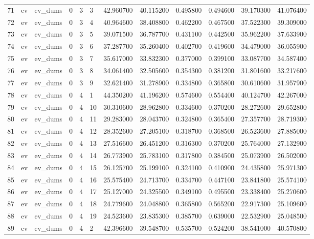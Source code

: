 \begin{tabular}{llllllrrrrrr}
71 & ev & ev_dums & 0 & 3 & 3 & 42.960700 & 40.115200 & 0.495800 & 0.494600 & 39.170300 & 41.076400 \\
72 & ev & ev_dums & 0 & 3 & 4 & 40.964600 & 38.408800 & 0.462200 & 0.467500 & 37.522300 & 39.309000 \\
73 & ev & ev_dums & 0 & 3 & 5 & 39.071500 & 36.787700 & 0.431100 & 0.442500 & 35.962200 & 37.633900 \\
74 & ev & ev_dums & 0 & 3 & 6 & 37.287700 & 35.260400 & 0.402700 & 0.419600 & 34.479000 & 36.055900 \\
75 & ev & ev_dums & 0 & 3 & 7 & 35.617000 & 33.832300 & 0.377000 & 0.399100 & 33.087700 & 34.587400 \\
76 & ev & ev_dums & 0 & 3 & 8 & 34.061400 & 32.505600 & 0.354300 & 0.381200 & 31.801600 & 33.217600 \\
77 & ev & ev_dums & 0 & 3 & 9 & 32.621400 & 31.278900 & 0.334800 & 0.365800 & 30.610600 & 31.957900 \\
78 & ev & ev_dums & 0 & 4 & 1 & 44.350200 & 41.196200 & 0.574600 & 0.554400 & 40.124700 & 42.267000 \\
79 & ev & ev_dums & 0 & 4 & 10 & 30.310600 & 28.962800 & 0.334600 & 0.370200 & 28.272600 & 29.652800 \\
80 & ev & ev_dums & 0 & 4 & 11 & 29.283000 & 28.043700 & 0.324800 & 0.365400 & 27.357700 & 28.719300 \\
81 & ev & ev_dums & 0 & 4 & 12 & 28.352600 & 27.205100 & 0.318700 & 0.368500 & 26.523600 & 27.885000 \\
82 & ev & ev_dums & 0 & 4 & 13 & 27.516600 & 26.451200 & 0.316300 & 0.370200 & 25.764000 & 27.132900 \\
83 & ev & ev_dums & 0 & 4 & 14 & 26.773900 & 25.783100 & 0.317800 & 0.384500 & 25.073900 & 26.502000 \\
84 & ev & ev_dums & 0 & 4 & 15 & 26.125700 & 25.199100 & 0.324100 & 0.410900 & 24.435800 & 25.971300 \\
85 & ev & ev_dums & 0 & 4 & 16 & 25.575400 & 24.713700 & 0.334700 & 0.447100 & 23.841800 & 25.574100 \\
86 & ev & ev_dums & 0 & 4 & 17 & 25.127000 & 24.325500 & 0.349100 & 0.495500 & 23.338400 & 25.270600 \\
87 & ev & ev_dums & 0 & 4 & 18 & 24.779600 & 24.048800 & 0.365800 & 0.565200 & 22.917300 & 25.109600 \\
88 & ev & ev_dums & 0 & 4 & 19 & 24.523600 & 23.835300 & 0.385700 & 0.639000 & 22.532900 & 25.048500 \\
89 & ev & ev_dums & 0 & 4 & 2 & 42.396600 & 39.548700 & 0.535700 & 0.524200 & 38.541000 & 40.570800 \\

\end{tabular}
